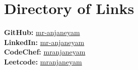 \documentclass[letterpaper,11pt]{article}
\begin{document}
\section{Directory of Links}
 \begin{itemize}[leftmargin=0.15in, label={}]
    \small{\item{
     \textbf{GitHub: }\href{https://github.com/mr-anjaneyam}{mr-anjaneyam} \\
     \textbf{LinkedIn: }\href{https://linkedin.com/mr-anjaneyam}{mr-anjaneyam}\\
     \textbf{CodeChef: }\href{https://codechef.com/users/mr_anjaneyam}{mr\textunderscore anjaneyam} \\
     \textbf{Leetcode: }\href{https://leetcode.com/mr_anjaneyam/}{mr\textunderscore anjaneyam} \\

    }}
 \end{itemize}


\end{document}
